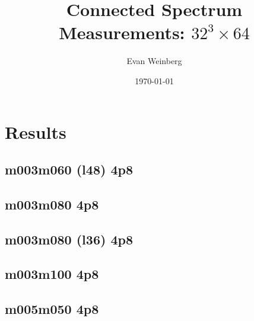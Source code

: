 \documentclass[pdftex,letterpaper,10pt]{article}
\begin{document}
\title{Connected Spectrum Measurements: $32^3 \times 64$}
\author{Evan Weinberg}
\date{\today}
\maketitle

\tableofcontents

\clearpage




\clearpage

\section{Results}

\subsection{m003m060 (l48) 4p8}



\clearpage \subsection{m003m080 4p8}



\clearpage \subsection{m003m080 (l36) 4p8}



\clearpage \subsection{m003m100 4p8}



\clearpage \subsection{m005m050 4p8}
\end{document}
